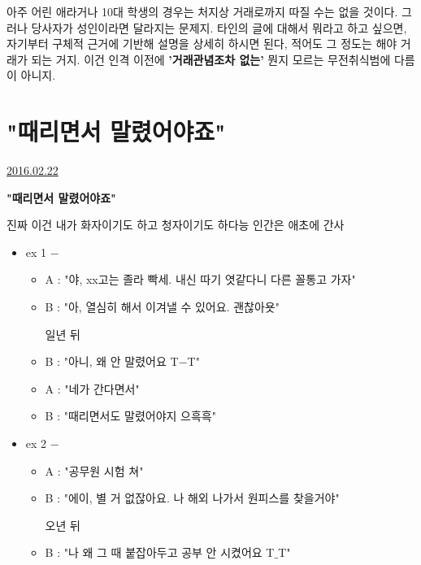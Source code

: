 아주 어린 애라거나 10대 학생의 경우는 처지상 거래로까지 따질 수는 없을 것이다.
그러나 당사자가 성인이라면 달라지는 문제지.
타인의 글에 대해서 뭐라고 하고 싶으면, 자기부터 구체적 근거에 기반해 설명을 상세히 하시면 된다,
적어도 그 정도는 해야 거래가 되는 거지.  이건 인격 이전에 \textbf{'거래관념조차 없는'} 뭔지 모르는 무전취식범에 다름이 아니지.
\vspace{5mm}








\section{"때리면서 말렸어야죠"}
\href{https://www.kockoc.com/Apoc/645641}{2016.02.22}

\vspace{5mm}

\textbf{"때리면서 말렸어야죠"}
\vspace{5mm}

진짜 이건 내가 화자이기도 하고 청자이기도 하다능
인간은 애초에 간사
\vspace{5mm}

\vspace{5mm}

\begin{itemize}
    \item[] ex 1 $-$
    
    \begin{itemize}
        \item[] A : "야, xx고는 졸라 빡세. 내신 따기 엿같다니 다른 꼴통고 가자"
        \item[] B : "아, 열심히 해서 이겨낼 수 있어요. 괜찮아욧"
    \vspace{5mm}
    
    일년 뒤
    \vspace{5mm}
    
        \item[] B : "아니, 왜 안 말렸어요 T$-$T"
        \item[] A : "네가 간다면서"
        \item[] B : "때리면서도 말렸어야지 으흑흑"
    \vspace{5mm}
    \end{itemize}
    \item[] ex 2 $-$

    \vspace{5mm}
    
    \begin{itemize}
        \item[] A : "공무원 시험 쳐"
        \item[] B : "에이, 별 거 없잖아요. 나 해외 나가서 원피스를 찾을거야"
    \vspace{5mm}
    
    오년 뒤
    \vspace{5mm}
    
    \item[] B : "나 왜 그 때 붙잡아두고 공부 안 시켰어요 T$\_$T"
    \end{itemize}
\end{itemize}
\vspace{5mm}

